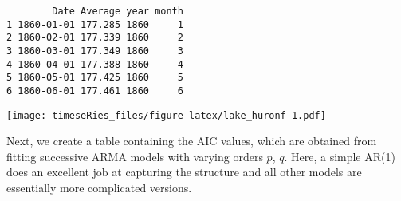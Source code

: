 \documentclass[]{book}
\newenvironment{Shaded}{\begin{snugshade}}{\end{snugshade}}
\newcommand{\KeywordTok}[1]{\textcolor[rgb]{0.13,0.29,0.53}{\textbf{#1}}}
\newcommand{\DataTypeTok}[1]{\textcolor[rgb]{0.13,0.29,0.53}{#1}}
\newcommand{\DecValTok}[1]{\textcolor[rgb]{0.00,0.00,0.81}{#1}}
\newcommand{\CharTok}[1]{\textcolor[rgb]{0.31,0.60,0.02}{#1}}
\newcommand{\StringTok}[1]{\textcolor[rgb]{0.31,0.60,0.02}{#1}}
\newcommand{\CommentTok}[1]{\textcolor[rgb]{0.56,0.35,0.01}{\textit{#1}}}
\newcommand{\OperatorTok}[1]{\textcolor[rgb]{0.81,0.36,0.00}{\textbf{#1}}}
\newcommand{\NormalTok}[1]{#1}
\begin{document}
\begin{verbatim}
        Date Average year month
1 1860-01-01 177.285 1860     1
2 1860-02-01 177.339 1860     2
3 1860-03-01 177.349 1860     3
4 1860-04-01 177.388 1860     4
5 1860-05-01 177.425 1860     5
6 1860-06-01 177.461 1860     6
\end{verbatim}

\begin{Shaded}
\end{Shaded}

\texttt{[image: timeseRies\_files/figure-latex/lake\_huronf-1.pdf]}

Next, we create a table containing the AIC values, which are obtained
from fitting successive ARMA models with varying orders \(p\), \(q\).
Here, a simple AR(1) does an excellent job at capturing the structure
and all other models are essentially more complicated versions.
\end{document}
